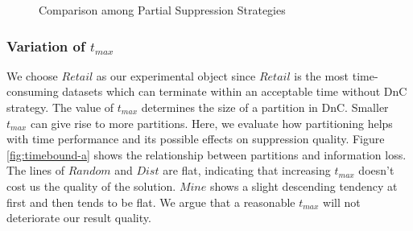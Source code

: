 \begin{figure}[th]
\centering
  \flushleft
{}
\caption{Comparison among Partial Suppression Strategies}
\label{fig:partial}
\end{figure}

\subsubsection{Variation of $t_{max}$}\label{sec:eval:timebound}
We choose $Retail$ as our experimental object since $Retail$ is the most
time-consuming datasets which can terminate within an acceptable time without DnC strategy.
The value of $t_{max}$ determines the size of a partition in DnC. Smaller
$t_{max}$ can give rise to more partitions. Here, we
evaluate how partitioning helps with time performance and
its possible effects on suppression quality.
Figure \ref{fig:timebound-a} shows the relationship between partitions
and information loss. The lines of $Random$ and $Dist$ are flat, indicating that
increasing $t_{max}$ doesn't cost us the quality of the solution. $Mine$
shows a slight descending tendency at first and then tends to be flat.
We argue that a reasonable $t_{max}$ will not deteriorate our result quality.



